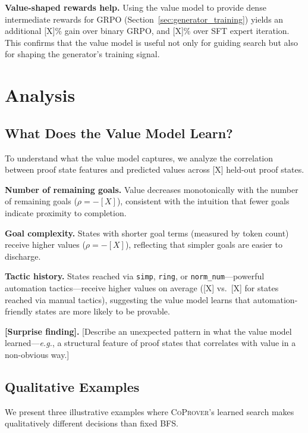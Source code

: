 \documentclass{article}
\newcommand{\coprover}{\textsc{CoProver}}
\newcommand{\eg}{\textit{e.g.}}
\begin{document}
\textbf{Value-shaped rewards help.} Using the value model to provide dense intermediate rewards for GRPO (Section~\ref{sec:generator_training}) yields an additional [X]\% gain over binary GRPO, and [X]\% over SFT expert iteration. This confirms that the value model is useful not only for guiding search but also for shaping the generator's training signal.

\section{Analysis}
\label{sec:analysis}

\subsection{What Does the Value Model Learn?}

To understand what the value model captures, we analyze the correlation between proof state features and predicted values across [X] held-out proof states.

\textbf{Number of remaining goals.} Value decreases monotonically with the number of remaining goals ($\rho = -[X]$), consistent with the intuition that fewer goals indicate proximity to completion.

\textbf{Goal complexity.} States with shorter goal terms (measured by token count) receive higher values ($\rho = -[X]$), reflecting that simpler goals are easier to discharge.

\textbf{Tactic history.} States reached via \texttt{simp}, \texttt{ring}, or \texttt{norm\_num}---powerful automation tactics---receive higher values on average ([X] vs.\ [X] for states reached via manual tactics), suggesting the value model learns that automation-friendly states are more likely to be provable.

\textbf{[Surprise finding].} [Describe an unexpected pattern in what the value model learned---\eg, a structural feature of proof states that correlates with value in a non-obvious way.]

\subsection{Qualitative Examples}

We present three illustrative examples where \coprover{}'s learned search makes qualitatively different decisions than fixed BFS.
\end{document}
